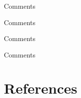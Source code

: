 \documentclass[aspectratio=169,xcolor=dvipsnames]{beamer}
\begin{document}
\begin{frame}{Comments}


\end{frame}


\begin{frame}{Comments}


\end{frame}


\begin{frame}{Comments}


\end{frame}


\begin{frame}{Comments}


\end{frame}







 \section{References}
\end{document}
